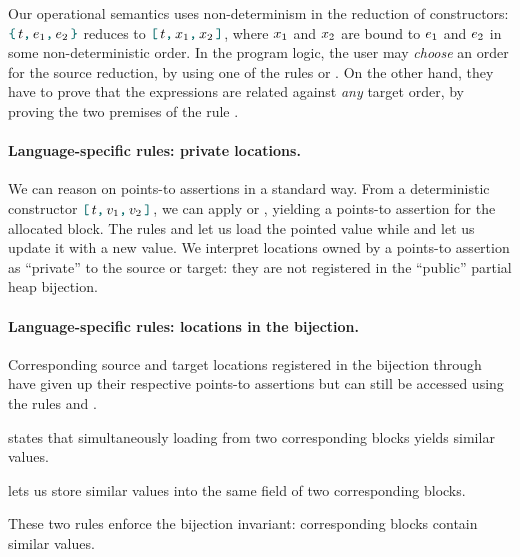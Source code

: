 Our operational semantics uses non-determinism in the reduction of constructors: $\datalangBlock{\datalangTag}{\datalangExpr_1}{\datalangExpr_2}$ reduces to $\datalangBlockDet{\datalangTag}{\datalangVar_1}{\datalangVar_2}$, where $\datalangVar_1$ and $\datalangVar_2$ are bound to $\datalangExpr_1$ and $\datalangExpr_2$ in some non-deterministic order.
In the program logic, the user may \emph{choose} an order for the source reduction, by using one of the rules  or . On the other hand, they have to prove that the expressions are related against \emph{any} target order, by proving the two premises of the rule .

\paragraph{Language-specific rules: private locations.}
We can reason on points-to assertions in a standard way.
From a deterministic constructor $\datalangBlockDet{\datalangTag}{\datalangVal_1}{\datalangVal_2}$, we can apply  or , yielding a points-to assertion for the allocated block.
The rules  and  let us load the pointed value while  and  let us update it with a new value.
We interpret locations owned by a points-to assertion as ``private'' to the source or target: they are not registered in the ``public'' partial heap bijection.

\paragraph{Language-specific rules: locations in the bijection.}
Corresponding source and target locations registered in the bijection through  have given up their respective points-to assertions but can still be accessed using the rules  and .

 states that simultaneously loading from two corresponding blocks yields similar values.

 lets us store similar values into the same field of two corresponding blocks.

These two rules enforce the bijection invariant: corresponding blocks contain similar values.

